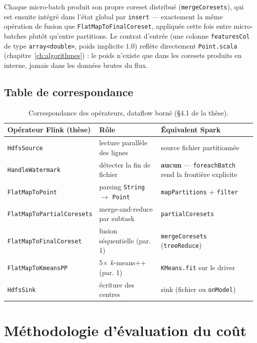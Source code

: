 Chaque micro-batch produit son propre coreset distribué (\texttt{mergeCoresets}),
qui est ensuite intégré dans l'état global par \texttt{insert} --- exactement
la même opération de fusion que \texttt{FlatMapToFinalCoreset}, appliquée
cette fois entre micro-batches plutôt qu'entre partitions. Le contrat
d'entrée (une colonne \texttt{featuresCol} de type \texttt{array<double>},
poids implicite $1.0$) reflète directement \texttt{Point.scala}
(chapitre~\ref{ch:algorithmes}) : le poids n'existe que dans les coresets
produits en interne, jamais dans les données brutes du flux.

\subsection{Table de correspondance}

\begin{table}[h]
\centering
\small
\begin{tabular}{p{3.6cm}p{4.6cm}p{4.6cm}}
\toprule
\textbf{Opérateur Flink (thèse)} & \textbf{Rôle} & \textbf{Équivalent Spark} \\
\midrule
\texttt{HdfsSource} & lecture parallèle des lignes & source fichier partitionnée \\
\texttt{HandleWatermark} & détecter la fin de fichier & \textbf{aucun} --- \texttt{foreachBatch} rend la frontière explicite \\
\texttt{FlatMapToPoint} & parsing \texttt{String} $\to$ \texttt{Point} & \texttt{mapPartitions} + \texttt{filter} \\
\texttt{FlatMapToPartialCoresets} & merge-and-reduce par subtask & \texttt{partialCoresets} \\
\texttt{FlatMapToFinalCoreset} & fusion séquentielle (par. 1) & \texttt{mergeCoresets} (\texttt{treeReduce}) \\
\texttt{FlatMapToKmeansPP} & 5$\times$ $k$-means++ (par. 1) & \texttt{KMeans.fit} sur le driver \\
\texttt{HdfsSink} & écriture des centres & sink (fichier ou \texttt{onModel}) \\
\bottomrule
\end{tabular}
\caption{Correspondance des opérateurs, dataflow borné (§4.1 de la thèse).}
\end{table}

\section{Méthodologie d'évaluation du coût}
\label{sec:impl-evaluation}

